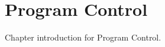 \pagebreak
\chapter{Program Control}
\label{sec:program_control}

Chapter introduction for Program Control. 
